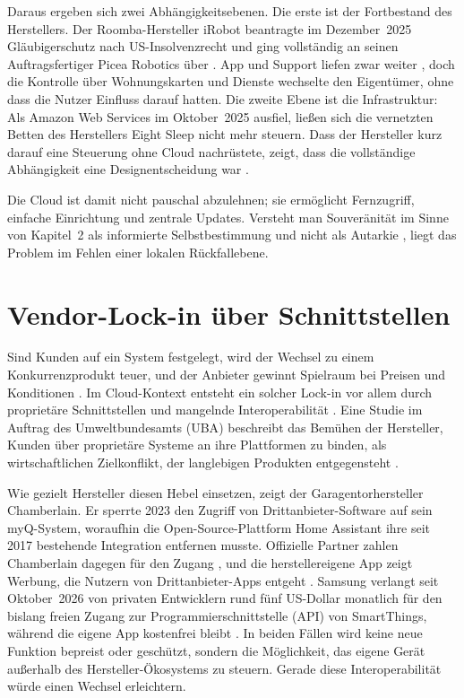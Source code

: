 Daraus ergeben sich zwei Abhängigkeitsebenen. Die erste ist der Fortbestand
des Herstellers. Der Roomba-Hersteller iRobot beantragte im Dezember~2025
Gläubigerschutz nach US-Insolvenzrecht und ging vollständig an seinen
Auftragsfertiger Picea Robotics über \autocite[vgl.][]{fortune:2025}. App
und Support liefen zwar weiter \autocite[vgl.][]{trustedreviews:2026}, doch
die Kontrolle über Wohnungskarten und Dienste wechselte den Eigentümer, ohne
dass die Nutzer Einfluss darauf hatten. Die zweite Ebene ist die
Infrastruktur: Als Amazon Web Services im Oktober~2025 ausfiel, ließen sich
die vernetzten Betten des Herstellers Eight Sleep nicht mehr steuern. Dass
der Hersteller kurz darauf eine Steuerung ohne Cloud nachrüstete, zeigt, dass
die vollständige Abhängigkeit eine Designentscheidung war
\autocite[vgl.][]{patterson:2025}.

Die Cloud ist damit nicht pauschal abzulehnen; sie ermöglicht Fernzugriff,
einfache Einrichtung und zentrale Updates. Versteht man Souveränität im Sinne
von Kapitel~2 als informierte Selbstbestimmung und nicht als Autarkie
\autocite[vgl.][]{ternes:2022}, liegt das Problem im Fehlen einer lokalen
Rückfallebene.

\section{Vendor-Lock-in über Schnittstellen}\label{sec:cloud-lockin}

Sind Kunden auf ein System festgelegt, wird der Wechsel zu einem
Konkurrenzprodukt teuer, und der Anbieter gewinnt Spielraum bei Preisen und
Konditionen \autocite[vgl.][]{shapiro:1999}. Im Cloud-Kontext entsteht ein
solcher Lock-in vor allem durch proprietäre Schnittstellen und mangelnde
Interoperabilität \autocite[vgl.][]{oparamartins:2016}. Eine Studie im
Auftrag des Umweltbundesamts (\acrshort{UBA}) beschreibt das Bemühen der
Hersteller, Kunden über proprietäre Systeme an ihre Plattformen zu binden,
als wirtschaftlichen Zielkonflikt, der langlebigen Produkten entgegensteht
\autocite[vgl.][S.~39]{jaegererben:2023}.

Wie gezielt Hersteller diesen Hebel einsetzen, zeigt der Garagentorhersteller
Chamberlain. Er sperrte 2023 den Zugriff von Drittanbieter-Software auf sein
myQ-System, woraufhin die Open-Source-Plattform Home Assistant ihre seit 2017
bestehende Integration entfernen musste. Offizielle Partner zahlen
Chamberlain dagegen für den Zugang \autocite[vgl.][]{homeassistant:2023},
und die herstellereigene App zeigt Werbung, die Nutzern von Drittanbieter-Apps
entgeht \autocite[vgl.][]{ninetofivemac:2023}. Samsung verlangt seit
Oktober~2026 von privaten Entwicklern rund fünf US-Dollar monatlich für den
bislang freien Zugang zur Programmierschnittstelle (\acrshort{API}) von
SmartThings, während die eigene App kostenfrei bleibt
\autocites[vgl.][]{sammobile:2026}{androidpure:2026}. In beiden Fällen wird
keine neue Funktion bepreist oder geschützt, sondern die Möglichkeit, das
eigene Gerät außerhalb des Hersteller-Ökosystems zu steuern. Gerade diese
Interoperabilität würde einen Wechsel erleichtern.

